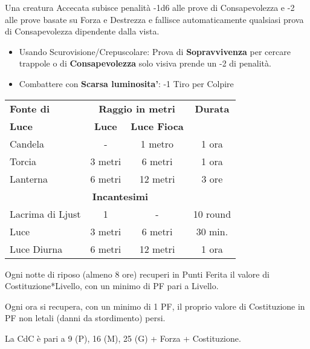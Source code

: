 \documentclass[landscape,10pt,a4paper]{article}
\begin{document}
\begin{multicols}{3}
\begin{dmbox}[title=Visione]
Una creatura Accecata subisce penalità -1d6 alle prove di Consapevolezza e -2 alle prove basate su Forza e Destrezza e fallisce automaticamente qualsiasi prova di Consapevolezza dipendente dalla vista.

\begin{itemize}[leftmargin=0.5cm,itemsep=-1pt,parsep=0pt]
\item Usando Scurovisione/Crepuscolare: Prova di \textbf{Sopravvivenza} per cercare trappole o di \textbf{Consapevolezza} solo visiva prende un -2 di penalità.
\item Combattere con \textbf{Scarsa luminosita'}: -1 Tiro per Colpire
\end{itemize}
\end{dmbox}		

\begin{dmbox}[title=Fonti di Luce]	

\noindent\begin{tabular}{l|cc|c}
	\textbf{Fonte di} &\multicolumn{2}{c}{\textbf{Raggio in metri}}& \textbf{Durata}  \\
	\textbf{Luce}& \textbf{Luce} & \textbf{Luce Fioca} &\\
	Candela & - & 1 metro & 1 ora\\
	Torcia & 3 metri & 6 metri & 1 ora\\
	Lanterna & 6 metri & 12 metri & 3 ore \\
	\multicolumn{4}{c}{\textbf{Incantesimi}}\\
	Lacrima di Ljust & 1 & - & 10 round\\
	Luce  & 3 metri & 6 metri &30 min. \\
	Luce Diurna & 6 metri & 12 metri & 1 ora 
\end{tabular}
\end{dmbox}			

\begin{dmbox}[title=Riposare 8 ore]	
Ogni notte di riposo (almeno 8 ore) recuperi in Punti Ferita il valore di Costituzione*Livello, con un minimo di PF pari a Livello. 	
\end{dmbox}				
	

\begin{dmbox}[title=Danni temporanei]	
Ogni ora si recupera, con un minimo di 1 PF, il proprio valore di Costituzione in PF non letali (danni da stordimento) persi.
\end{dmbox}		

		

\begin{dmbox}[title=Capacità di Carico]	
La CdC è pari a 9 (P), 16 (M), 25 (G) + Forza + Costituzione.
\end{dmbox}		



\end{multicols}
\end{document}
